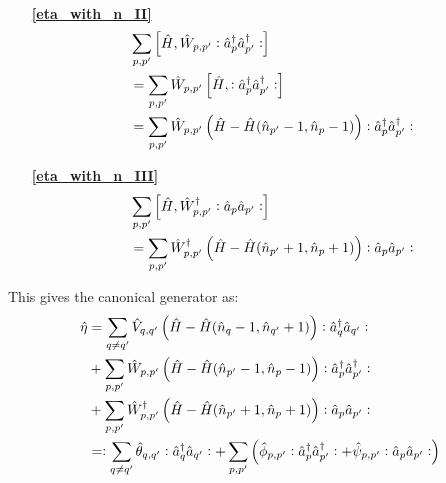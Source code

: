 \begin{appendix}
\begin{itemize}
\begin{align}
\end{align}
\item[\textbf{\ref{eta_with_n_II}}] 
\begin{align}
&\sum\limits_{p,p^\prime}\left[\hat H,\hat W_{p,p^\prime}\vcentcolon \hat a^\dagger_p\hat a^\dagger_{p^\prime}\vcentcolon\right] \nonumber \\
&=\sum\limits_{p,p^\prime}\hat W_{p,p^\prime}\left[\hat H,\vcentcolon \hat a^\dagger_p\hat a^\dagger_{p^\prime}\vcentcolon\right] \nonumber\\
&= \sum\limits_{p,p^\prime}\hat W_{p,p^\prime}\left(\hat H-\hat H(\hat n_{p^\prime}-1,\hat n_p -1)\right)\vcentcolon \hat a^\dagger_p\hat a^\dagger_{p^\prime}\vcentcolon
\end{align}
\item[\textbf{\ref{eta_with_n_III}}] 
\begin{align}
&\sum\limits_{p,p^\prime}\left[\hat H,\hat W_{p,p^\prime}^\dagger\vcentcolon\hat a_p\hat a_{p^\prime} \vcentcolon \right] \nonumber \\
&= \sum\limits_{p,p^\prime}\hat W_{p,p^\prime}^\dagger\left(\hat H-\hat H(\hat n_{p^\prime}+1,\hat n_p +1)\right)\vcentcolon \hat a_p\hat a_{p^\prime}\vcentcolon
\end{align}
\end{itemize}
This gives the canonical generator as:
\begin{align}
\hat\eta &=  \sum\limits_{q\neq q^\prime}\hat V_{q,q^\prime} \left(\hat H - \hat H(\hat n_q-1,\hat n_{q^\prime}+1)\right) \vcentcolon \hat a^\dagger_q\hat a_{q^\prime}\vcentcolon \\
&+\sum\limits_{p,p^\prime}\hat W_{p,p^\prime}\left(\hat H-\hat H(\hat n_{p^\prime}-1,\hat n_p -1)\right)\vcentcolon \hat a^\dagger_p\hat a^\dagger_{p^\prime}\vcentcolon\nonumber\\
&+ \sum\limits_{p,p^\prime}\hat W_{p,p^\prime}^\dagger\left(\hat H-\hat H(\hat n_{p^\prime}+1,\hat n_p +1)\right)\vcentcolon \hat a_p\hat a_{p^\prime}\vcentcolon\nonumber\\
&=\vcentcolon \sum\limits_{q\neq q^\prime}\hat \theta_{q,q^\prime}\vcentcolon \hat a^\dagger_q\hat a_{q^\prime}\vcentcolon+\sum\limits_{p,p^\prime}\left(\hat \phi_{p,p^\prime}\vcentcolon \hat a^\dagger_p\hat a^\dagger_{p^\prime}\vcentcolon+\hat \psi_{p,p^\prime}\vcentcolon\hat a_p\hat a_{p^\prime}\vcentcolon\right) \label{psiphitheta_def}
\end{align}

\end{appendix}
